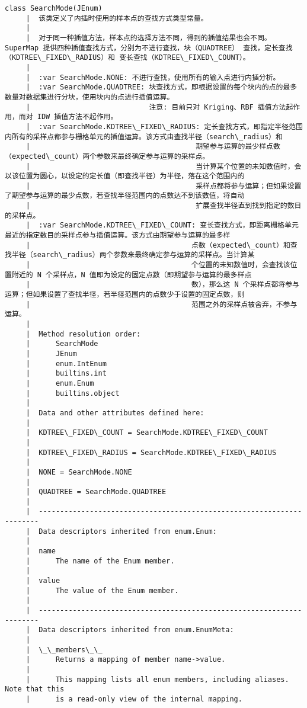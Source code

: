 \documentclass[11pt]{article}
\begin{document}
\begin{Verbatim}[commandchars=\\\{\}]
    class SearchMode(JEnum)
     |  该类定义了内插时使用的样本点的查找方式类型常量。
     |  
     |  对于同一种插值方法，样本点的选择方法不同，得到的插值结果也会不同。SuperMap 提供四种插值查找方式，分别为不进行查找，块（QUADTREE） 查找，定长查找（KDTREE\_FIXED\_RADIUS）和 变长查找（KDTREE\_FIXED\_COUNT）。
     |  
     |  :var SearchMode.NONE: 不进行查找，使用所有的输入点进行内插分析。
     |  :var SearchMode.QUADTREE: 块查找方式，即根据设置的每个块内的点的最多数量对数据集进行分块，使用块内的点进行插值运算。
     |                            注意: 目前只对 Kriging、RBF 插值方法起作用，而对 IDW 插值方法不起作用。
     |  :var SearchMode.KDTREE\_FIXED\_RADIUS: 定长查找方式，即指定半径范围内所有的采样点都参与栅格单元的插值运算。该方式由查找半径（search\_radius）和
     |                                       期望参与运算的最少样点数（expected\_count）两个参数来最终确定参与运算的采样点。
     |                                       当计算某个位置的未知数值时，会以该位置为圆心，以设定的定长值（即查找半径）为半径，落在这个范围内的
     |                                       采样点都将参与运算；但如果设置了期望参与运算的最少点数，若查找半径范围内的点数达不到该数值，将自动
     |                                       扩展查找半径直到找到指定的数目的采样点。
     |  :var SearchMode.KDTREE\_FIXED\_COUNT: 变长查找方式，即距离栅格单元最近的指定数目的采样点参与插值运算。该方式由期望参与运算的最多样
     |                                      点数（expected\_count）和查找半径（search\_radius）两个参数来最终确定参与运算的采样点。当计算某
     |                                      个位置的未知数值时，会查找该位置附近的 N 个采样点，N 值即为设定的固定点数（即期望参与运算的最多样点
     |                                      数），那么这 N 个采样点都将参与运算；但如果设置了查找半径，若半径范围内的点数少于设置的固定点数，则
     |                                      范围之外的采样点被舍弃，不参与运算。
     |  
     |  Method resolution order:
     |      SearchMode
     |      JEnum
     |      enum.IntEnum
     |      builtins.int
     |      enum.Enum
     |      builtins.object
     |  
     |  Data and other attributes defined here:
     |  
     |  KDTREE\_FIXED\_COUNT = SearchMode.KDTREE\_FIXED\_COUNT
     |  
     |  KDTREE\_FIXED\_RADIUS = SearchMode.KDTREE\_FIXED\_RADIUS
     |  
     |  NONE = SearchMode.NONE
     |  
     |  QUADTREE = SearchMode.QUADTREE
     |  
     |  ----------------------------------------------------------------------
     |  Data descriptors inherited from enum.Enum:
     |  
     |  name
     |      The name of the Enum member.
     |  
     |  value
     |      The value of the Enum member.
     |  
     |  ----------------------------------------------------------------------
     |  Data descriptors inherited from enum.EnumMeta:
     |  
     |  \_\_members\_\_
     |      Returns a mapping of member name->value.
     |      
     |      This mapping lists all enum members, including aliases. Note that this
     |      is a read-only view of the internal mapping.
    

\end{Verbatim}
\end{document}
